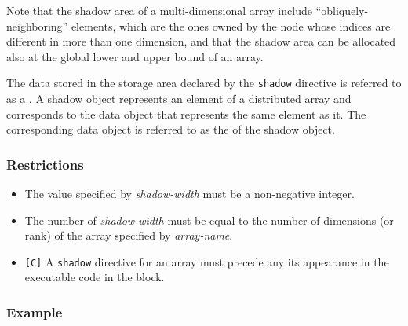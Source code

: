 Note that the shadow area of a multi-dimensional array include
``obliquely-neighboring'' elements, which are the ones owned by the node 
whose indices are different in more than one dimension, and that the
shadow area can be allocated also at the global lower and upper bound of
an array.

The data stored in the storage area declared by the {\tt shadow}
directive is referred to as a {\it {}}.
%
A shadow object represents an element of a distributed array and 
corresponds to the data object that represents the same
element as it. The corresponding data object is referred to as the
{\it {}} of the shadow object.



\subsubsection*{Restrictions}

\begin{itemize}
\item The value specified by {\it shadow-width} must be a non-negative
      integer.
\item The number of {\it shadow-width} must be equal to the number of
      dimensions (or rank) of the array specified by {\it array-name}.
\item \verb![C]! A {\tt shadow} directive for an array must
      precede any its appearance in the executable code in the block.
\end{itemize}

\subsubsection*{Example}

